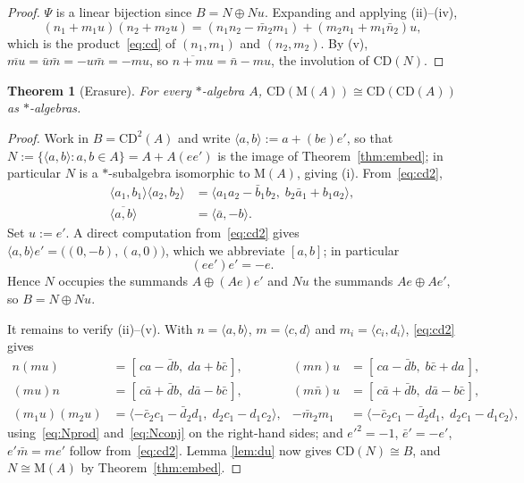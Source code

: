 \documentclass[11pt]{amsart}
\theoremstyle{plain}
\newtheorem{theorem}{Theorem}[section]
\theoremstyle{definition}
\newcommand{\CD}{\mathrm{CD}}
\newcommand{\MM}{\mathrm{M}}
\begin{document}
\begin{proof}
$\Psi$ is a linear bijection since $B=N\oplus Nu$. Expanding and applying
(ii)--(iv),
\[
  (n_1+m_1u)(n_2+m_2u)
  =(n_1n_2-\bar m_2m_1)+(m_2n_1+m_1\bar n_2)u,
\]
which is the product~\eqref{eq:cd} of $(n_1,m_1)$ and $(n_2,m_2)$. By (v),
$\overline{mu}=\bar u\bar m=-u\bar m=-mu$, so
$\overline{n+mu}=\bar n-mu$, the involution of $\CD(N)$.
\end{proof}

\begin{theorem}[Erasure]\label{thm:erasure}
For every $*$-algebra $A$, $\CD(\MM(A))\cong\CD(\CD(A))$ as $*$-algebras.
\end{theorem}

\begin{proof}
Work in $B=\CD^{2}(A)$ and write $\langle a,b\rangle:=a+(be)e'$, so that
$N:=\{\langle a,b\rangle: a,b\in A\}=A+A(ee')$ is the image of
Theorem~\ref{thm:embed}; in particular $N$ is a $*$-subalgebra isomorphic to
$\MM(A)$, giving (i). From~\eqref{eq:cd2},
\begin{align}
  \langle a_1,b_1\rangle\langle a_2,b_2\rangle
    &=\langle a_1a_2-\bar b_1b_2,\; b_2\bar a_1+b_1a_2\rangle,
      \label{eq:Nprod}\\
  \overline{\langle a,b\rangle}&=\langle \bar a,-b\rangle. \label{eq:Nconj}
\end{align}
Set $u:=e'$. A direct computation from~\eqref{eq:cd2} gives
$\langle a,b\rangle e'=\big((0,-b),(a,0)\big)$, which we abbreviate $[a,b]$;
in particular
\begin{equation}\label{eq:eee}
  (ee')e'=-e .
\end{equation}
Hence $N$ occupies the summands $A\oplus(Ae)e'$ and $Nu$ the summands
$Ae\oplus Ae'$, so $B=N\oplus Nu$.

It remains to verify (ii)--(v). With $n=\langle a,b\rangle$, $m=\langle c,d\rangle$
and $m_i=\langle c_i,d_i\rangle$, \eqref{eq:cd2} gives
\begin{align*}
  n(mu)&=[\,ca-\bar d b,\; da+b\bar c\,], &
  (mn)u&=[\,ca-\bar d b,\; b\bar c+da\,],\\
  (mu)n&=[\,c\bar a+\bar d b,\; d\bar a-b\bar c\,], &
  (m\bar n)u&=[\,c\bar a+\bar d b,\; d\bar a-b\bar c\,],\\
  (m_1u)(m_2u)&=\langle -\bar c_2c_1-\bar d_2d_1,\; d_2c_1-d_1c_2\rangle, &
  -\bar m_2m_1&=\langle -\bar c_2c_1-\bar d_2d_1,\; d_2c_1-d_1c_2\rangle,
\end{align*}
using~\eqref{eq:Nprod} and~\eqref{eq:Nconj} on the right-hand sides; and
$e'^{2}=-1$, $\bar e'=-e'$, $e'\bar m=me'$ follow from~\eqref{eq:cd2}. Lemma
\ref{lem:du} now gives $\CD(N)\cong B$, and $N\cong\MM(A)$ by
Theorem~\ref{thm:embed}.
\end{proof}
\end{document}
